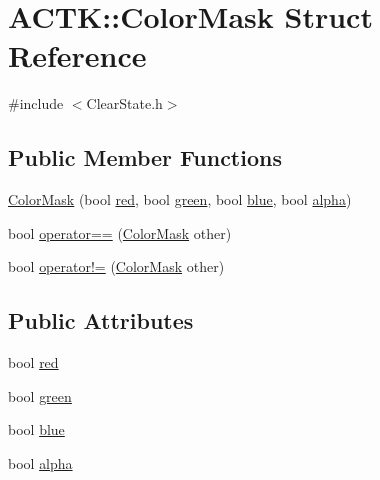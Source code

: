 \hypertarget{struct_a_c_t_k_1_1_color_mask}{\section{A\-C\-T\-K\-:\-:Color\-Mask Struct Reference}
\label{struct_a_c_t_k_1_1_color_mask}
}


{\ttfamily \#include $<$Clear\-State.\-h$>$}

\subsection*{Public Member Functions}
\begin{DoxyCompactItemize}
\item 
\hyperlink{struct_a_c_t_k_1_1_color_mask_a9603daa3553403db06f9d5680d5f20d2}{Color\-Mask} (bool \hyperlink{struct_a_c_t_k_1_1_color_mask_a5bf146687b67213ef1c0c5f8a1b6c9d3}{red}, bool \hyperlink{struct_a_c_t_k_1_1_color_mask_a268f8854b308c34c444234b77e2e14c5}{green}, bool \hyperlink{struct_a_c_t_k_1_1_color_mask_a48b6d25da2fa3c1982f0931c751e043f}{blue}, bool \hyperlink{struct_a_c_t_k_1_1_color_mask_ad46f08b725271b8a81a0842a7bb21351}{alpha})
\item 
bool \hyperlink{struct_a_c_t_k_1_1_color_mask_ae54cad63b6f88acf789e3a3ab48b621c}{operator==} (\hyperlink{struct_a_c_t_k_1_1_color_mask}{Color\-Mask} other)
\item 
bool \hyperlink{struct_a_c_t_k_1_1_color_mask_aee46d6e92b1005a9ec6f4a1204fefd69}{operator!=} (\hyperlink{struct_a_c_t_k_1_1_color_mask}{Color\-Mask} other)
\end{DoxyCompactItemize}
\subsection*{Public Attributes}
\begin{DoxyCompactItemize}
\item 
bool \hyperlink{struct_a_c_t_k_1_1_color_mask_a5bf146687b67213ef1c0c5f8a1b6c9d3}{red}
\item 
bool \hyperlink{struct_a_c_t_k_1_1_color_mask_a268f8854b308c34c444234b77e2e14c5}{green}
\item 
bool \hyperlink{struct_a_c_t_k_1_1_color_mask_a48b6d25da2fa3c1982f0931c751e043f}{blue}
\item 
bool \hyperlink{struct_a_c_t_k_1_1_color_mask_ad46f08b725271b8a81a0842a7bb21351}{alpha}
\end{DoxyCompactItemize}


